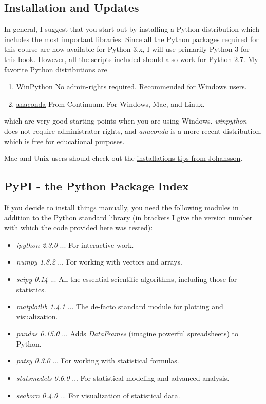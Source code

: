 \subsection{Installation and Updates}

In general, I suggest that you start out by installing a Python distribution which includes the most important libraries. Since all the Python packages required for this course are now available for Python 3.x, I will use primarily Python 3 for this book. However, all the scripts included should also work for Python 2.7. My favorite Python distributions  are

\begin{enumerate}
    \item \href{https://winpython.github.io/}{WinPython} No admin-rights required. Recommended for Windows users.
    \item \href{https://store.continuum.io/cshop/anaconda/}{anaconda} From Continuum. For Windows, Mac, and Linux.
\end{enumerate}

which are very good starting points when you are using Windows. \emph{winpython} does not require administrator rights, and \emph{anaconda} is a more recent distribution, which is free for educational purposes.

Mac and Unix users should check out the \href{https://github.com/jrjohansson/scientific-python-lectures}{installations tips from Johansson}.

\subsection{PyPI - the Python Package Index}

If you decide to install things manually, you need the following modules in addition to the Python standard library (in brackets I give the version number with which the code provided here was tested):

\begin{itemize}
  \item \emph{ipython 2.3.0} ... For interactive work.
  \item \emph{numpy 1.8.2} ... For working with vectors and arrays.
  \item \emph{scipy 0.14} ... All the essential scientific algorithms, including those for statistics.
  \item \emph{matplotlib 1.4.1} ... The de-facto standard module for plotting and visualization.
  \item \emph{pandas 0.15.0} ... Adds \emph{DataFrames} (imagine powerful spreadsheets) to Python.
  \item \emph{patsy 0.3.0} ... For working with statistical formulas.
  \item \emph{statsmodels 0.6.0} ... For statistical modeling and advanced analysis.
  \item \emph{seaborn 0.4.0} ... For visualization of statistical data.
\end{itemize}

